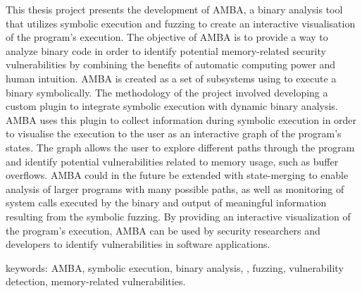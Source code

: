
This thesis project presents the development of AMBA, a binary analysis
tool that utilizes symbolic execution and fuzzing to create an interactive
visualisation of the program's execution. The objective of AMBA is to provide
a way to analyze binary code in order to identify potential memory-related security
vulnerabilities by combining the benefits of automatic computing power and
human intuition. AMBA is created as a set of subsystems using \stoe{} to
execute a binary symbolically. The methodology of the project involved
developing a custom \stoe{} plugin to integrate symbolic execution with
dynamic binary analysis. AMBA uses this plugin to collect information during
symbolic execution in order to visualise the execution to the user as an
interactive graph of the program's states. The graph allows the user to explore 
different paths through the program and identify potential vulnerabilities 
related to memory usage, such as buffer overflows. AMBA could in the future  
be extended with state-merging to enable analysis of larger programs with 
many possible paths, as well as monitoring of system calls executed by the binary and 
output of meaningful information resulting from the symbolic fuzzing. By 
providing an interactive visualization of the program's execution, AMBA can 
be used by security researchers and developers to identify vulnerabilities in 
software applications.


keywords: AMBA, symbolic execution, binary analysis, \stoe{},
fuzzing, vulnerability detection, memory-related vulnerabilities.